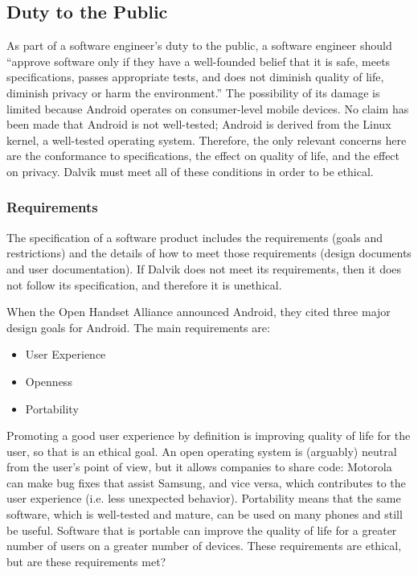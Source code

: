\documentclass[11pt]{article}
\begin{document}
\begin{multicols}{2}

\subsection{Duty to the Public} %
\label{sub:public}

As part of a software engineer's duty to the public, a software engineer should
``approve software only if they have a well-founded belief that it is safe,
meets specifications, passes appropriate tests, and does not diminish quality of
life, diminish privacy or harm the environment.'' \cite[\S~1.03]{secode}  The
possibility of its damage is limited because Android operates on consumer-level
mobile devices.  No claim has been made that Android is not well-tested; Android
is derived from the Linux kernel, a well-tested operating system.  Therefore,
the only relevant concerns here are the conformance to specifications, the
effect on quality of life, and the effect on privacy.  Dalvik must meet all of
these conditions in order to be ethical.

\subsubsection{Requirements} %
\label{ssub:requirements}

The specification of a software product includes the requirements (goals and
restrictions) and the details of how to meet those requirements (design
documents and user documentation).  If Dalvik does not meet its requirements,
then it does not follow its specification, and therefore it is unethical.

When the Open Handset Alliance announced Android, they cited three major
design goals for Android.  The main requirements are: \cite{open-handset-alliance-ann}

\begin{itemize}
    \item User Experience
    \item Openness
    \item Portability
\end{itemize}

Promoting a good user experience by definition is improving quality of life for
the user, so that is an ethical goal.  An open operating system is (arguably)
neutral from the user's point of view, but it allows companies to share code:
Motorola can make bug fixes that assist Samsung, and vice versa, which
contributes to the user experience (i.e. less unexpected behavior).  Portability
means that the same software, which is well-tested and mature, can be used on
many phones and still be useful.  Software that is portable can improve the
quality of life for a greater number of users on a greater number of devices.
These requirements are ethical, but are these requirements met?


\end{multicols}
\end{document}
